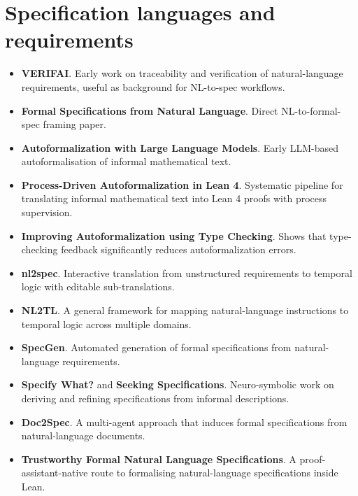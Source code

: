 \documentclass[natbib=false,acmsmall,nonacm,11pt]{acmart}
\begin{document}
\section{Specification languages and requirements}\label{sec:specification-requirements}
\begin{itemize}
\item \textbf{VERIFAI}. Early work on traceability and verification of natural-language requirements, useful as background for NL-to-spec workflows.~\cite{verifai_project}
\item \textbf{Formal Specifications from Natural Language}. Direct NL-to-formal-spec framing paper.~\cite{DBLP:journals/corr/abs-2206-01962}
\item \textbf{Autoformalization with Large Language Models}. Early LLM-based autoformalisation of informal mathematical text.~\cite{DBLP:journals/corr/abs-2205-12615}
\item \textbf{Process-Driven Autoformalization in Lean 4}. Systematic pipeline for translating informal mathematical text into Lean 4 proofs with process supervision.~\cite{DBLP:journals/corr/abs-2406-01940}
\item \textbf{Improving Autoformalization using Type Checking}. Shows that type-checking feedback significantly reduces autoformalization errors.~\cite{DBLP:journals/corr/abs-2406-07222}
\item \textbf{nl2spec}. Interactive translation from unstructured requirements to temporal logic with editable sub-translations.~\cite{DBLP:conf/cav/CoslerHMST23}
\item \textbf{NL2TL}. A general framework for mapping natural-language instructions to temporal logic across multiple domains.~\cite{DBLP:conf/emnlp/ChenGZF23}
\item \textbf{SpecGen}. Automated generation of formal specifications from natural-language requirements.~\cite{DBLP:conf/icse/MaL0XB25}
\item \textbf{Specify What?} and \textbf{Seeking Specifications}. Neuro-symbolic work on deriving and refining specifications from informal descriptions.~\cite{DBLP:conf/ifm/GranberryAJ24,DBLP:journals/corr/abs-2504-21061}
\item \textbf{Doc2Spec}. A multi-agent approach that induces formal specifications from natural-language documents.~\cite{DBLP:journals/corr/abs-2602-04892}
\item \textbf{Trustworthy Formal Natural Language Specifications}. A proof-assistant-native route to formalising natural-language specifications inside Lean.~\cite{DBLP:conf/onward/GordonM23}

\end{itemize}
\end{document}
